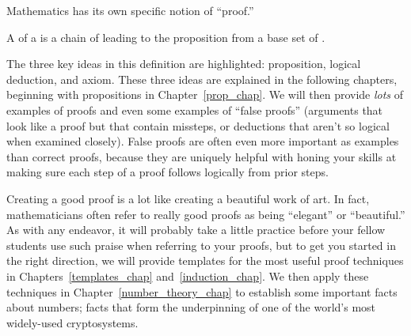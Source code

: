 Mathematics has its own specific notion of ``proof.''

\begin{definition*}
A  of a  is a chain of  leading to the proposition from a base set of .
\end{definition*}

The three key ideas in this definition are highlighted: proposition,
logical deduction, and axiom.  These three ideas are explained in the
following chapters, beginning with propositions in
Chapter~\ref{prop_chap}.  We will then provide \emph{lots} of examples
of proofs and even some examples of ``false proofs'' (\ie arguments
that look like a proof but that contain missteps, or deductions that
aren't so logical when examined closely).  False proofs are often even
more important as examples than correct proofs, because they are
uniquely helpful with honing your skills at making sure each step of a
proof follows logically from prior steps.

Creating a good proof is a lot like creating a beautiful work of art.
In fact, mathematicians often refer to really good proofs as being
``elegant'' or ``beautiful.''  As with any endeavor, it will probably
take a little practice before your fellow students use such praise
when referring to your proofs, but to get you started in the right
direction, we will provide templates for the most useful proof
techniques in Chapters~\ref{templates_chap} and~\ref{induction_chap}.
We then apply these techniques in Chapter~\ref{number_theory_chap} to
establish some important facts about numbers; facts that form the
underpinning of one of the world's most widely-used cryptosystems.

\endinput
